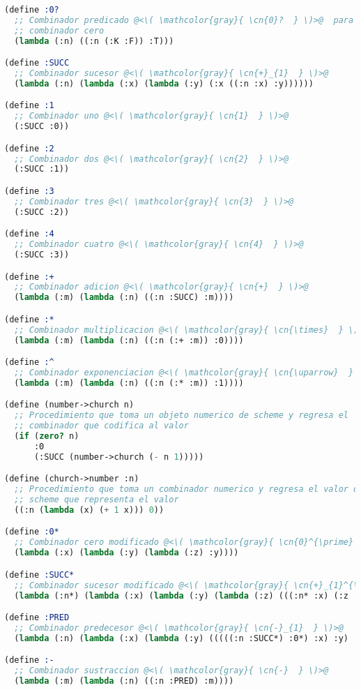 \begin{lstlisting}[language=scheme]
(define :0?
  ;; Combinador predicado @<\( \mathcolor{gray}{ \cn{0}?  } \)>@  para determinar si un termino lambda es el
  ;; combinador cero
  (lambda (:n) ((:n (:K :F)) :T)))

(define :SUCC
  ;; Combinador sucesor @<\( \mathcolor{gray}{ \cn{+}_{1}  } \)>@
  (lambda (:n) (lambda (:x) (lambda (:y) (:x ((:n :x) :y))))))

(define :1
  ;; Combinador uno @<\( \mathcolor{gray}{ \cn{1}  } \)>@
  (:SUCC :0))

(define :2
  ;; Combinador dos @<\( \mathcolor{gray}{ \cn{2}  } \)>@
  (:SUCC :1))

(define :3
  ;; Combinador tres @<\( \mathcolor{gray}{ \cn{3}  } \)>@
  (:SUCC :2))

(define :4
  ;; Combinador cuatro @<\( \mathcolor{gray}{ \cn{4}  } \)>@
  (:SUCC :3))

(define :+
  ;; Combinador adicion @<\( \mathcolor{gray}{ \cn{+}  } \)>@
  (lambda (:m) (lambda (:n) ((:n :SUCC) :m))))

(define :*
  ;; Combinador multiplicacion @<\( \mathcolor{gray}{ \cn{\times}  } \)>@
  (lambda (:m) (lambda (:n) ((:n (:+ :m)) :0))))

(define :^
  ;; Combinador exponenciacion @<\( \mathcolor{gray}{ \cn{\uparrow}  } \)>@
  (lambda (:m) (lambda (:n) ((:n (:* :m)) :1))))

(define (number->church n)
  ;; Procedimiento que toma un objeto numerico de scheme y regresa el
  ;; combinador que codifica al valor
  (if (zero? n)
      :0
      (:SUCC (number->church (- n 1)))))

(define (church->number :n)
  ;; Procedimiento que toma un combinador numerico y regresa el valor de
  ;; scheme que representa el valor
  ((:n (lambda (x) (+ 1 x))) 0))

(define :0*
  ;; Combinador cero modificado @<\( \mathcolor{gray}{ \cn{0}^{\prime}  } \)>@ (utilizado para computar el predecesor)
  (lambda (:x) (lambda (:y) (lambda (:z) :y))))

(define :SUCC*
  ;; Combinador sucesor modificado @<\( \mathcolor{gray}{ \cn{+}_{1}^{\prime}  } \)>@  (utilizado para computar el predecesor)
  (lambda (:n*) (lambda (:x) (lambda (:y) (lambda (:z) (((:n* :x) (:z :y)) :x))))))

(define :PRED
  ;; Combinador predecesor @<\( \mathcolor{gray}{ \cn{-}_{1}  } \)>@
  (lambda (:n) (lambda (:x) (lambda (:y) (((((:n :SUCC*) :0*) :x) :y) :I)))))

(define :-
  ;; Combinador sustraccion @<\( \mathcolor{gray}{ \cn{-}  } \)>@
  (lambda (:m) (lambda (:n) ((:n :PRED) :m))))

\end{lstlisting}

